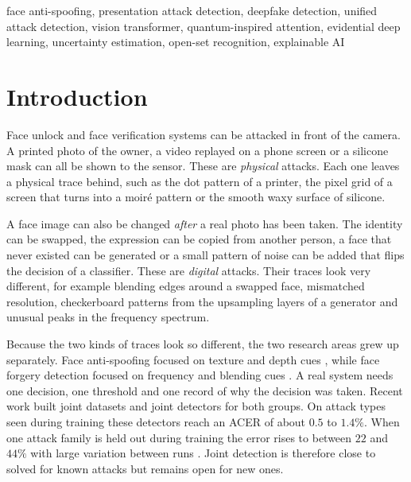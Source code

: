 \documentclass[conference]{IEEEtran}
\begin{document}
\begin{IEEEkeywords}
face anti-spoofing, presentation attack detection, deepfake detection, unified
attack detection, vision transformer, quantum-inspired attention, evidential deep
learning, uncertainty estimation, open-set recognition, explainable AI
\end{IEEEkeywords}

\section{Introduction}
Face unlock and face verification systems can be attacked in front of the camera.
A printed photo of the owner, a video replayed on a phone screen or a silicone mask
can all be shown to the sensor. These are \emph{physical} attacks. Each one leaves
a physical trace behind, such as the dot pattern of a printer, the pixel grid of a
screen that turns into a moir\'e pattern or the smooth waxy surface of silicone.

A face image can also be changed \emph{after} a real photo has been taken. The
identity can be swapped, the expression can be copied from another person, a face
that never existed can be generated or a small pattern of noise can be added that
flips the decision of a classifier. These are \emph{digital} attacks. Their traces
look very different, for example blending edges around a swapped face, mismatched
resolution, checkerboard patterns from the upsampling layers of a generator and
unusual peaks in the frequency spectrum.

Because the two kinds of traces look so different, the two research areas grew up
separately. Face anti-spoofing focused on texture and depth cues
\cite{liu2018auxiliary,yu2020cdcn,yu2021revisiting,wang2022ssan}, while face forgery
detection focused on frequency and blending cues
\cite{rossler2019ff,li2020celebdf,frank2020frequency,wang2020cnnspot}. A real system
needs one decision, one threshold and one record of why the decision was taken.
Recent work
\cite{yu2024unified,yuan2024challenge,ma2025uniattackplus,chen2025uniattack,zhang2024unidefense}
built joint datasets and joint detectors for both groups. On attack types seen during
training these detectors reach an ACER of about $0.5$ to $1.4\%$. When one attack
family is held out during training the error rises to between $22$ and $44\%$ with
large variation between runs \cite{yu2024unified}. Joint detection is therefore close
to solved for known attacks but remains open for new ones.
\end{document}
